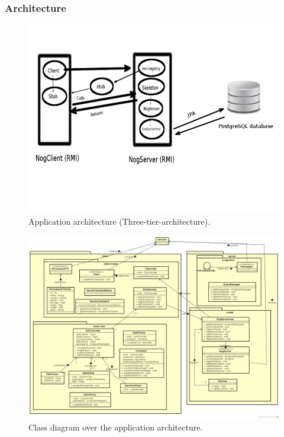 \documentclass[a4paper, 11pt]{article}
\begin{document}
\subsubsection{Architecture}
\begin{figure}[H]
\includegraphics[scale=0.50]{rmi_architecture.png}
\caption{Application architecture (Three-tier-architecture).}
\end{figure}
\begin{figure}[H]
\includegraphics[scale=0.30]{assignment2_architecture.png}
\caption{Class diagram over the application architecture.}
\end{figure}
\end{document}
